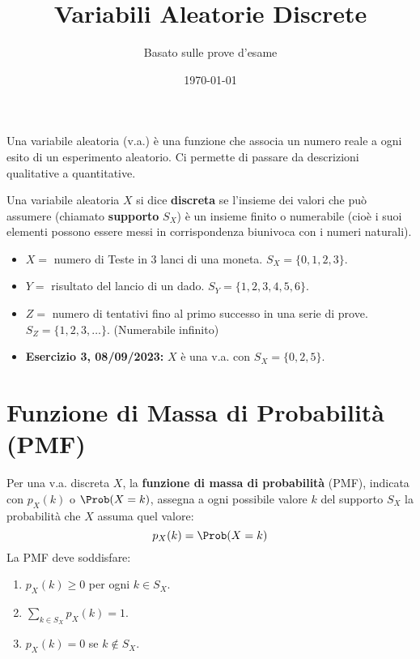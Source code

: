 

\title{Variabili Aleatorie Discrete}
\author{Basato sulle prove d'esame}
\date{\today}



\maketitle
\tableofcontents
\newpage

\label{cap:va_discrete}
Una variabile aleatoria (v.a.) è una funzione che associa un numero reale a ogni esito di un esperimento aleatorio. Ci permette di passare da descrizioni qualitative a quantitative.

\begin{definition}
Una variabile aleatoria $X$ si dice \textbf{discreta} se l'insieme dei valori che può assumere (chiamato \textbf{supporto} $S_X$) è un insieme finito o numerabile (cioè i suoi elementi possono essere messi in corrispondenza biunivoca con i numeri naturali).
\end{definition}

\begin{example}
\begin{itemize}
    \item $X = $ numero di Teste in 3 lanci di una moneta. $S_X = \{0, 1, 2, 3\}$.
    \item $Y = $ risultato del lancio di un dado. $S_Y = \{1, 2, 3, 4, 5, 6\}$.
    \item $Z = $ numero di tentativi fino al primo successo in una serie di prove. $S_Z = \{1, 2, 3, \dots\}$. (Numerabile infinito)
    \item \textbf{Esercizio 3, 08/09/2023:} $X$ è una v.a. con $S_X = \{0, 2, 5\}$.
\end{itemize}
\end{example}

\section{Funzione di Massa di Probabilità (PMF)}
\begin{definition}
Per una v.a. discreta $X$, la \textbf{funzione di massa di probabilità} (PMF), indicata con $p_X(k)$ o $\Prob(X=k)$, assegna a ogni possibile valore $k$ del supporto $S_X$ la probabilità che $X$ assuma quel valore:
\[ p_X(k) = \Prob(X=k) \]
La PMF deve soddisfare:
\begin{enumerate}
    \item $p_X(k) \ge 0$ per ogni $k \in S_X$.
    \item $\sum_{k \in S_X} p_X(k) = 1$.
    \item $p_X(k) = 0$ se $k \notin S_X$.
\end{enumerate}
\end{definition}

